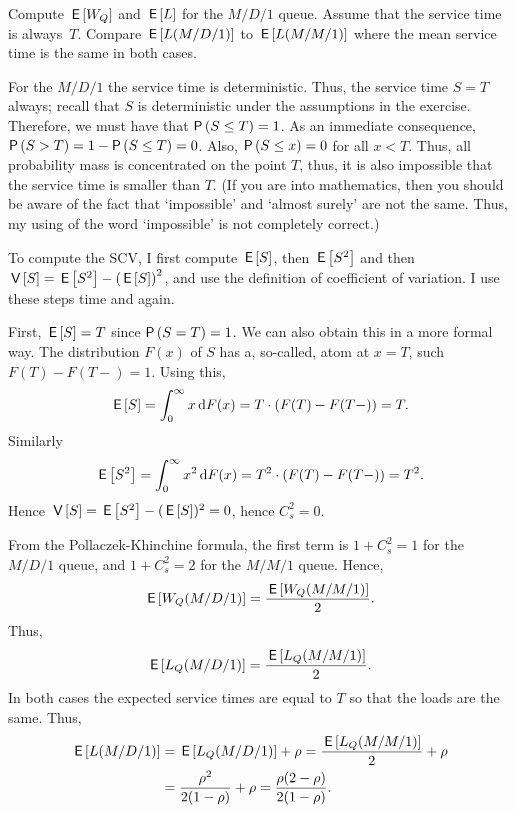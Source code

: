 \begin{exercise}
  Compute $\,\mathsf{E}\left[W_Q\right]$ and $\,\mathsf{E}\left[L\right]$ for the $M/D/1$ queue. Assume that the
  service time is always~$T$. Compare $\,\mathsf{E}\left[L(M/D/1)\right]$ to $\,\mathsf{E}\left[L(M/M/1)\right]$
  where the mean service time is the same in both cases.
\begin{solution}
  For the $M/D/1$ the service time is deterministic. Thus, the service time $S=T$ always; recall that $S$ is   deterministic under the assumptions in the exercise. Therefore, we
  must have that $\P{S\leq T} = 1$. As an immediate consequence,
  $\P{S>T} = 1-\P{S\leq T} = 0$. Also, $\P{S \leq x} = 0$ for all
  $x<T$. Thus, all probability mass is concentrated on the point $T$,
  thus, it is also impossible that the service time is smaller than
  $T$.  (If you are into mathematics, then you should be aware of the fact
  that `impossible' and `almost surely' are not the same. Thus, my
  using of the word `impossible' is not completely correct.)

  To compute the SCV, I first compute $\,\mathsf{E}\left[S\right]$, then $\,\mathsf{E}\left[S^2\right]$ and then
  $\,\mathsf{V}\left[S\right] = \,\mathsf{E}\left[S^2\right] - \left(\,\mathsf{E}\left[S\right]\right)^2$, and use the definition of
  coefficient of variation. I use these steps time and again.

  First, $\,\mathsf{E}\left[S\right] = T$ since $\P{S=T} =1$. We can also obtain this in a
  more formal way. The distribution $F(x)$ of $S$ has a, so-called, atom at
  $x=T$, such $F(T) - F(T-) =1$.  Using this,
  \begin{equation*}
    \,\mathsf{E}\left[S\right] = \int_0^\infty x \,\text{d}F(x) = T\cdot (F(T)-F(T-)) = T.
  \end{equation*}
Similarly
\begin{equation*}
\,\mathsf{E}\left[S^2\right] = \int_0^\infty x^2 \,\text{d}F(x) = T^2\cdot (F(T)-F(T-)) = T^2.
\end{equation*}
Hence $\,\mathsf{V}\left[S\right] = \,\mathsf{E}\left[S^2\right] - (\,\mathsf{E}\left[S\right])^2 = 0$, hence $C_s^2 = 0$.

From the Pollaczek-Khinchine formula, the first term is $1+C_s^2=1$ for the $M/D/1$ queue, and $1+C_s^2=2$ for the $M/M/1$ queue. Hence, 
  \begin{equation*}
\,\mathsf{E}\left[W_Q(M/D/1)\right] = \frac{\,\mathsf{E}\left[W_Q(M/M/1)\right]}2.
  \end{equation*}
Thus, 
\begin{equation*}
 \,\mathsf{E}\left[L_Q(M/D/1)\right] = \frac{\,\mathsf{E}\left[L_Q(M/M/1)\right]}2.    
\end{equation*}
In both cases the expected service times are equal to $T$ so that the loads are the same. Thus, 
\begin{equation*}
  \begin{split}
 \,\mathsf{E}\left[L(M/D/1)\right] &= \,\mathsf{E}\left[L_Q(M/D/1)\right] +\rho = \frac{\,\mathsf{E}\left[L_Q(M/M/1)\right]}2 + \rho \\
&= \frac{\rho^2}{2(1-\rho)} + \rho=\frac{\rho(2-\rho)} {2(1-\rho)}.
  \end{split}
\end{equation*}
\end{solution}
\end{exercise}


